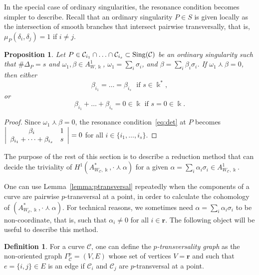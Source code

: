 \documentclass[11pt]{amsart}
\def\cC{\mathcal{C}}
\def\kk{\Bbbk}
\def\w{\omega}
\def\s{\sigma}
\theoremstyle{plain}
\newtheorem{proposition}[thm]{Proposition}
\theoremstyle{definition}
\newtheorem{definition}[thm]{Definition}
\begin{document}

In the special case of ordinary singularities, the resonance condition becomes simpler to describe. Recall that an ordinary singularity $P\in S$ is given locally as the intersection of smooth branches that intersect pairwise transversally, that is, $\mu_P(\delta_i,\delta_j)=1$ if $i\neq j$.

\begin{proposition}
\label{prop:ordinary_point}
Let $ P\in\cC_{i_1} \cap \ldots \cap \cC_{i_s} \subset {\rm Sing}(\cC)$ be an ordinary singularity such that $\#\Delta_P=s$ and $\w_1,\beta \in A^1_{W,\kk}$, $\w_1=\sum_i \sigma_i$, and 
$\beta=\sum_i \beta_i\sigma_i$. If $\w_1\curlywedge\beta=0$, then either 
\begin{equation}
\label{eq:equality}
\beta_{i_1} = \dots = \beta_{i_s} \,\, \textrm{ if } s\in\kk^*,
\end{equation}
or 
\begin{equation}
\beta_{i_1} + \dots + \beta_{i_s}=0\in\kk \textrm{ if } s=0\in\kk.
\end{equation}
\end{proposition}
\begin{proof}
Since $\w_1\curlywedge\beta=0$, the resonance condition~\eqref{eq:det} at $P$ becomes
$\left| \array{cc} \beta_i & 1 \\
\beta_{i_1}+\dots+\beta_{i_s} &  s \endarray \right|=0$ for all $i\in\{i_1,\dots,i_s\}$.
\end{proof}

The purpose of the rest of this section is to describe a reduction method that can decide the triviality of 
$H^1(A^*_{W_\cC,\kk},\cdot\curlywedge\alpha)$ for a given $\alpha=\sum_i \alpha_i\sigma_i\in A^1_{W_\cC,\kk}$. 

One can use Lemma~\ref{lemma:ptransversal} repeatedly when the components of a curve are pairwise $p$-transversal at a point, in order
to calculate the cohomology of $(A^*_{W_\cC,\kk},\cdot\curlywedge\alpha)$.
For technical reasons, we sometimes need $\alpha=\sum_i \alpha_i\s_i$ to be non-coordinate, that is, such that $\alpha_i\neq 0$ for all $i\in\mathbf{r}$. The following object will be useful to describe this method.

\begin{definition}
\label{def:ptransversalgraph}
For a curve $\cC$, one can define the \emph{$p$-transversality graph} as the non-oriented graph $\Gamma^p_{\cC}=(V,E)$ whose set of vertices $V=\mathbf{r}$ and such that $e=\{i,j\}\in E$ is an edge if $\cC_i$ and $\cC_j$ are $p$-transversal at a point.
\end{definition}
\end{document}
